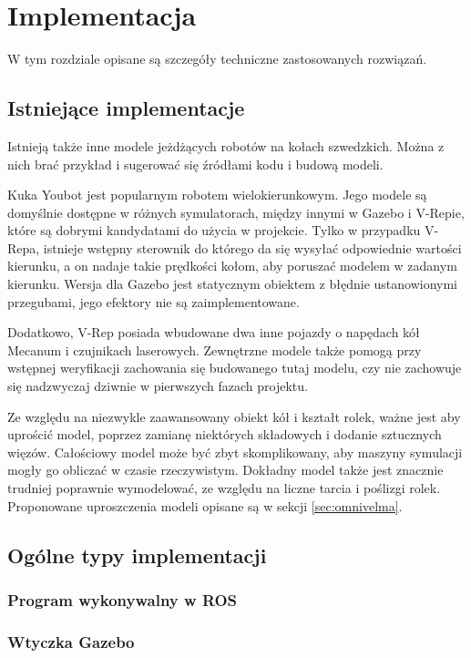 \chapter{Implementacja} 
\label{sec:implementation}
W tym rozdziale opisane są szczegóły techniczne zastosowanych rozwiązań.

\section{Istniejące implementacje}
	Istnieją także inne modele jeżdżących robotów na kołach szwedzkich.
	Można z nich brać przykład i sugerować się źródłami kodu i budową modeli.

	Kuka Youbot jest popularnym robotem wielokierunkowym. Jego modele są domyślnie dostępne w różnych symulatorach, między innymi w Gazebo i V-Repie, które są dobrymi kandydatami do 
	użycia w projekcie.
	Tylko w przypadku V-Repa, istnieje wstępny sterownik do którego da się wysyłać odpowiednie wartości kierunku, a on nadaje takie prędkości kołom, aby poruszać modelem w zadanym kierunku.
	Wersja dla Gazebo jest statycznym obiektem z błędnie ustanowionymi przegubami, jego efektory nie są zaimplementowane.
	
	Dodatkowo, V-Rep posiada wbudowane dwa inne pojazdy o napędach kół Mecanum i czujnikach laserowych.
	Zewnętrzne modele także pomogą przy wstępnej weryfikacji zachowania się budowanego tutaj modelu, czy nie zachowuje się nadzwyczaj dziwnie w pierwszych fazach projektu.

	Ze względu na niezwykle zaawansowany obiekt kół i kształt rolek, ważne jest aby uprościć model, poprzez zamianę niektórych składowych i dodanie sztucznych więzów.
	Całościowy model może być zbyt skomplikowany, aby maszyny symulacji mogły go obliczać w czasie rzeczywistym.
	Dokładny model także jest znacznie trudniej poprawnie wymodelować, ze względu na liczne tarcia i poślizgi rolek.
	Proponowane uproszczenia modeli opisane są w sekcji \ref{sec:omnivelma}.
	

\section{Ogólne typy implementacji}
	\subsection{Program wykonywalny w ROS}

	\subsection{Wtyczka Gazebo}
